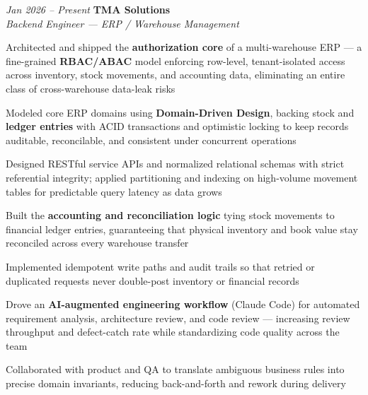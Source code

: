\begin{twocolentry}{\textit{Jan 2026 -- Present}}
    \textbf{TMA Solutions} \\[4pt]
    \textit{Backend Engineer — ERP / Warehouse Management}
\end{twocolentry}
\begin{onecolentry}
    \begin{highlights}
        \item Architected and shipped the \textbf{authorization core} of a multi-warehouse ERP — a fine-grained \textbf{RBAC/ABAC} model enforcing row-level, tenant-isolated access across inventory, stock movements, and accounting data, eliminating an entire class of cross-warehouse data-leak risks
        \item Modeled core ERP domains using \textbf{Domain-Driven Design}, backing stock and \textbf{ledger entries} with ACID transactions and optimistic locking to keep records auditable, reconcilable, and consistent under concurrent operations
        \item Designed RESTful service APIs and normalized relational schemas with strict referential integrity; applied partitioning and indexing on high-volume movement tables for predictable query latency as data grows
        \item Built the \textbf{accounting and reconciliation logic} tying stock movements to financial ledger entries, guaranteeing that physical inventory and book value stay reconciled across every warehouse transfer
        \item Implemented idempotent write paths and audit trails so that retried or duplicated requests never double-post inventory or financial records
        \item Drove an \textbf{AI-augmented engineering workflow} (Claude Code) for automated requirement analysis, architecture review, and code review — increasing review throughput and defect-catch rate while standardizing code quality across the team
        \item Collaborated with product and QA to translate ambiguous business rules into precise domain invariants, reducing back-and-forth and rework during delivery
    \end{highlights}
\end{onecolentry}
\vspace{0.2 cm}

